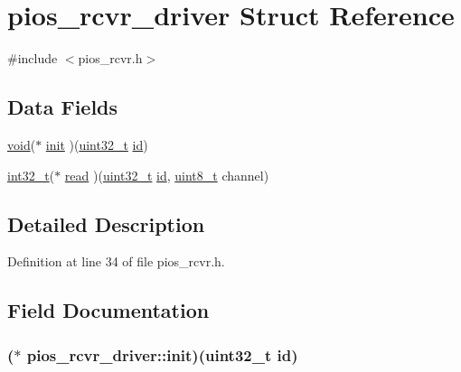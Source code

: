 \hypertarget{structpios__rcvr__driver}{\section{pios\-\_\-rcvr\-\_\-driver Struct Reference}
\label{structpios__rcvr__driver}
}


{\ttfamily \#include $<$pios\-\_\-rcvr.\-h$>$}

\subsection*{Data Fields}
\begin{DoxyCompactItemize}
\item 
\hyperlink{group___n_a_m_e_ga18028b8badbf1ea7e704ccac3c488e82}{void}($\ast$ \hyperlink{structpios__rcvr__driver_a9408f58f021157271f50346eb77b4e6c}{init} )(\hyperlink{stdint_8h_a435d1572bf3f880d55459d9805097f62}{uint32\-\_\-t} \hyperlink{group___u_a_v_gabaabdc509cdaba7df9f56c6c76f3ae19}{id})
\item 
\hyperlink{group___n_a_m_e_gafd12020da5a235dfcf0c3c748fb5baed}{int32\-\_\-t}($\ast$ \hyperlink{structpios__rcvr__driver_aece490b76542b52a499fe333f933372e}{read} )(\hyperlink{stdint_8h_a435d1572bf3f880d55459d9805097f62}{uint32\-\_\-t} \hyperlink{group___u_a_v_gabaabdc509cdaba7df9f56c6c76f3ae19}{id}, \hyperlink{stdint_8h_aba7bc1797add20fe3efdf37ced1182c5}{uint8\-\_\-t} channel)
\end{DoxyCompactItemize}


\subsection{Detailed Description}


Definition at line 34 of file pios\-\_\-rcvr.\-h.



\subsection{Field Documentation}
\hypertarget{structpios__rcvr__driver_a9408f58f021157271f50346eb77b4e6c}{
\subsubsection[{init}]{($\ast$ pios\-\_\-rcvr\-\_\-driver\-::init)({\bf uint32\-\_\-t} {\bf id})}}\label{structpios__rcvr__driver_a9408f58f021157271f50346eb77b4e6c}


